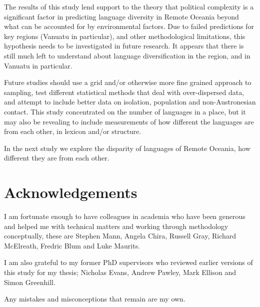 \documentclass[a4paper,10pt]{article} %
\begin{document}
The results of this study lend support to the theory that political complexity is a significant factor in predicting language diversity in Remote Oceania beyond what can be accounted for by environmental factors. Due to failed predictions for key regions (Vanuatu in particular), and other methodological limitations, this hypothesis needs to be investigated in future research. It appears that there is still much left to understand about language diversification in the region, and in Vanuatu in particular.

Future studies should use a grid and/or otherwise more fine grained approach to sampling, test different statistical methods that deal with over-dispersed data, and attempt to include better data on isolation, population and non-Austronesian contact. This study concentrated on the number of languages in a place, but it may also be revealing to include measurements of how different the languages are from each other, in lexicon and/or structure.

In the next study we explore the disparity of languages of Remote Oceania, how different they are from each other.



\newpage



\newpage
\singlespacing





\newpage
\section*{Acknowledgements}
I am fortunate enough to have colleagues in academia who have been generous and helped me with technical matters and working through methodology conceptually, these are Stephen Mann, Angela Chira, Russell Gray, Richard McElreath, Fredric Blum and Luke Maurits.

I am also grateful to my former PhD supervisors who reviewed earlier versions of this study for my thesis; Nicholas Evans, Andrew Pawley, Mark Ellison and Simon Greenhill. 

Any mistakes and misconceptions that remain are my own.
\end{document}
